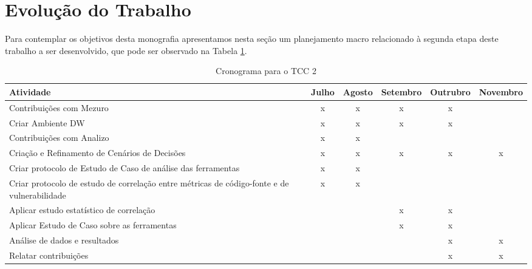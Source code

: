 
\section{Evolução do Trabalho}

%

Para contemplar os objetivos desta monografia apresentamos nesta seção um planejamento macro relacionado à segunda etapa deste trabalho a ser desenvolvido, que pode ser observado na Tabela \ref{tab:cronograma}.

%


	\begin{table}[H]
	\begin{center}
	    \begin{tabular}{ | p{5cm} | c | c |  c |  c |  c |}
	    \hline
	    Atividade & Julho & Agosto & Setembro & Outrubro & Novembro \\ \hline
	    Contribuições com Mezuro & x & x & x & x &  \\ \hline
	    Criar Ambiente DW & x & x & x & x & \\ \hline
	    Contribuições com Analizo & x & x &  &  & \\ \hline
	    Criação e Refinamento de Cenários de Decisões & x & x & x & x & x\\ \hline
	    Criar protocolo de Estudo de Caso de análise das ferramentas & x & x &  &  & \\ \hline
	    Criar protocolo de estudo de correlação entre métricas de código-fonte e de vulnerabilidade & x & x &  &  & \\ \hline
	    Aplicar estudo estatístico de correlação &  &  & x & x & \\ \hline
	    Aplicar Estudo de Caso sobre as ferramentas &  &  & x & x & \\ \hline
	    Análise de dados e resultados &  &  &  & x & x\\ \hline
	    Relatar contribuições &  &  &  & x & x\\ \hline
	    \end{tabular}
	    \caption{Cronograma para o TCC 2}
	    \label{tab:cronograma}
	\end{center}
	\end{table}

